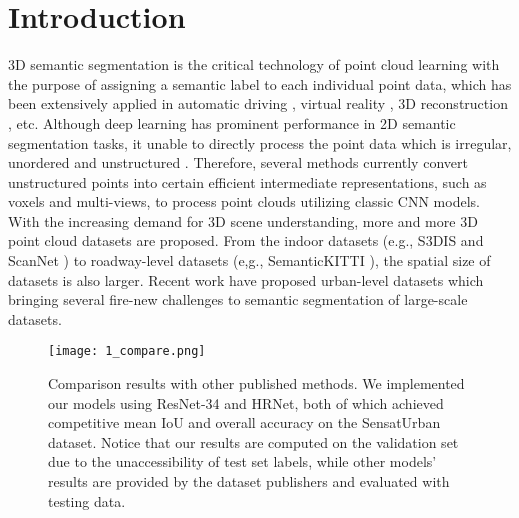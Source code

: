\documentclass[conference]{IEEEtran}
\begin{document}
\section{Introduction}
3D semantic segmentation is the critical technology of point cloud learning with the purpose of assigning a semantic label to each individual point data, which has been extensively applied in automatic driving \cite{Cortinhal2020SalsaNextFS}, virtual reality \cite{Hu2020RandLANetES}, 3D reconstruction \cite{Hu2020TowardsSS}, etc. Although deep learning has prominent performance in 2D semantic segmentation tasks, it unable to directly process the point data which is irregular, unordered and unstructured \cite{Xu2020SqueezeSegV3SC}.
Therefore, several methods \cite{Su2018SPLATNetSL, Rosu2020LatticeNetFP, Graham20183DSS,Tchapmi2017SEGCloudSS,Tatarchenko2018TangentCF,Lawin2017DeepP3,Wu2019SqueezeSegV2IM} currently convert unstructured points into certain efficient intermediate representations, such as voxels \cite{Huang2016PointCL,Graham20183DSS}and multi-views\cite{Lawin2017DeepP3,Tosteberg2017SemanticSO,Boulch2017UnstructuredPC}, to process point clouds utilizing classic CNN models.
With the increasing demand for 3D scene understanding, more and more 3D point cloud datasets are proposed. From the indoor datasets (e.g., S3DIS \cite{Armeni2017Joint2D} and ScanNet \cite{Dai2017ScanNetR3}) to roadway-level datasets (e,g., SemanticKITTI \cite{Behley2019SemanticKITTIAD}), the spatial size of datasets is also larger. Recent work \cite{Hu2020TowardsSS,Li2020Campus3DAP} have proposed urban-level datasets which bringing several fire-new challenges to semantic segmentation of large-scale datasets. 


\begin{figure}[t!]
\centering
\texttt{[image: 1\_compare.png]}
\caption{Comparison results with other published methods. We implemented our models using ResNet-34 and HRNet, both of which achieved competitive mean IoU and overall accuracy on the SensatUrban dataset. Notice that our results are computed on the validation set due to the unaccessibility of test set labels, while other models' results are provided by the dataset publishers and evaluated with testing data.}
\label{compare}
\end{figure}
\end{document}
